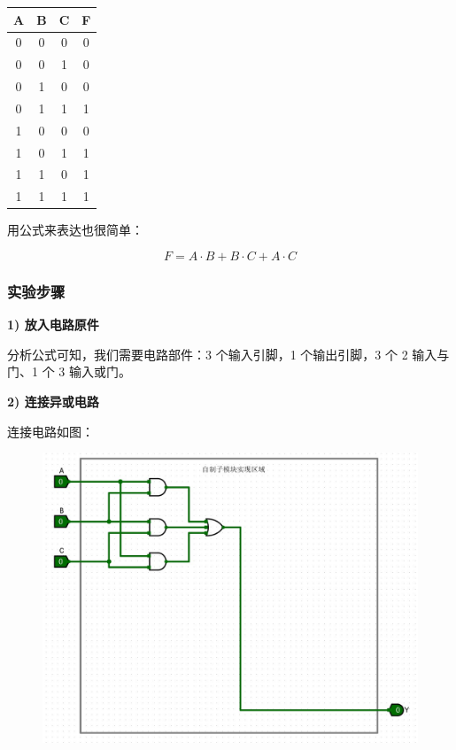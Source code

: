\documentclass[UTF8]{ctexart}
\begin{document}
\begin{center}
    \centering
    \begin{tabular}{ccc|c}
        \hline
        A & B & C & F \\
        \hline
        0 & 0 & 0 & 0 \\
        0 & 0 & 1 & 0 \\
        0 & 1 & 0 & 0 \\
        0 & 1 & 1 & 1 \\
        1 & 0 & 0 & 0 \\
        1 & 0 & 1 & 1 \\
        1 & 1 & 0 & 1 \\
        1 & 1 & 1 & 1 \\
        \hline
    \end{tabular}
\end{center}

用公式来表达也很简单：

\[
    F = A \cdot B + B \cdot C + A \cdot C
\]

\subsubsection{实验步骤}


\textbf{1) 放入电路原件}

分析公式可知，我们需要电路部件：3 个输入引脚，1 个输出引脚，3 个 2 输入与门、1 个 3 输入或门。

\textbf{2) 连接异或电路}

连接电路如图：

\begin{figure}[H]
    \centering
    \includegraphics[width = .8\textwidth]{images/vote.jpg}
\end{figure}
\end{document}
